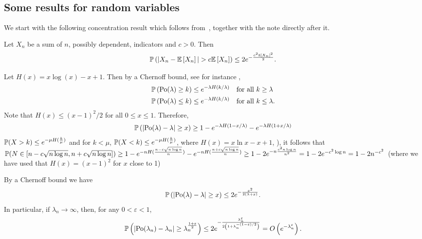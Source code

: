 \begin{appendices}
\section{Some results for random variables}

We start with the following concentration result which follows from~\cite[Theorem 4]{freedman1973another}, together with the note directly after it.

\begin{lemma}\label{lem:general_concentration_sum_indicators}
Let $X_n$ be a sum of $n$, possibly dependent, indicators and $c > 0$. Then
\[
	\mathbb{P}\left(|X_n - \mathbb{E}\left[X_n\right]| > c \mathbb{E}\left[X_n\right]\right) \le 2 e^{-\frac{c^2 \mathbb{E}\left[X_n\right]^2}{2}}.
\]
\end{lemma}

Let $H(x) = x\log(x) - x + 1$. Then by a Chernoff bound, see for instance \cite[Lemma 1.2]{penrose2003random},
\begin{align*}
	&\mathbb{P}\left({\mathrm{Po}}(\lambda) \ge k\right) \le e^{-\lambda H(k/\lambda)} \quad \text{for all } k \ge \lambda\\
	&\mathbb{P}\left({\mathrm{Po}}(\lambda) \le k\right) \le e^{-\lambda H(k/\lambda)} \quad \text{for all } k \le \lambda.
\end{align*}
Note that $H(x) \le (x-1)^2/2$ for all $0 \le x \le 1$. Therefore, 
\begin{align*}
	\mathbb{P}\left(\left|\mathrm{Po}(\lambda) - \lambda\right| \ge x\right) \ge 1 - e^{-\lambda H(1 - x/\lambda)} - e^{-\lambda H(1 + x/\lambda)}
\end{align*}
 $\mathbb{P}(X >k) \leq e^{-\mu H(\frac{k}{\mu})}$ and for $k<\mu$, $\mathbb{P}(X< k) \leq e^{-\mu H(\frac{k}{\mu})}$, where $H(x) = x\ln x -x+1$, \cite{penrose2003random}), it follows that $\mathbb{P}(N \in [n-c\sqrt{n\log n},n+c\sqrt{n\log n}]) \geq 1-e^{-n H(\frac{n-c\sqrt{n\log n}}{n})}-e^{-nH(\frac{n+c\sqrt{n \log n}}{n})} \geq  1-2e^{-n \frac{c^2 n \log n}{n^2}} = 1-2e^{-c^2\log n}=1-2n^{-c^2}$ (where we have used that $H(x) = (x-1)^2$ for $x$ close to 1)

By a Chernoff bound we have
\begin{equation}\label{eq:def_chernoff_bound_poisson}
	\mathbb{P}\left(\left|\mathrm{Po}(\lambda) - \lambda\right| \ge x\right) \le 2e^{-\frac{x^2}{2(\lambda + x)}}.
\end{equation}
In particular, if $\lambda_n \to \infty$, then, for any $0 < \varepsilon < 1$,
\[
	\mathbb{P}\left(\left|\mathrm{Po}(\lambda_n) - \lambda_n\right| \ge \lambda_n^{\frac{1+\varepsilon}{2}}\right) \le 2e^{-\frac{\lambda_n^\varepsilon}{2\left(1 + \lambda_n^{-(1 - \varepsilon)/2}\right)}}
	= O\left(e^{-\lambda_n^\varepsilon}\right).
\]


\end{appendices}
